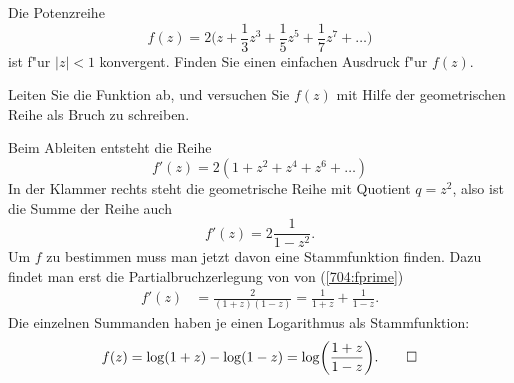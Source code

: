 Die Potenzreihe
\[
f(z)
=
2\biggl(z+\frac{1}{3}z^3+\frac{1}{5}z^5+\frac{1}{7}z^7+\dots\biggr)
\]
ist f"ur $|z|<1$ konvergent.
Finden Sie einen einfachen Ausdruck f"ur $f(z)$.

\begin{hinweis}
Leiten Sie die Funktion ab, und versuchen Sie $f(z)$ mit Hilfe der
geometrischen Reihe als Bruch zu schreiben.
\end{hinweis}

\begin{loesung}
Beim Ableiten entsteht die Reihe
\[
f'(z) = 2(1+z^2+z^4+z^6+\dots)
\]
In der Klammer rechts steht die geometrische Reihe mit Quotient $q=z^2$,
also ist die Summe der Reihe auch
\begin{equation}
f'(z)=2\frac{1}{1-z^2}.
\label{704:fprime}
\end{equation}
Um $f$ zu bestimmen muss man jetzt davon eine Stammfunktion finden.
Dazu findet man erst die Partialbruchzerlegung von von (\ref{704:fprime})
\begin{align*}
f'(z)
&=
\frac{2}{(1+z)(1-z)}
=
\frac1{1+z}+\frac1{1-z}.
\end{align*}
Die einzelnen Summanden haben je einen Logarithmus als Stammfunktion:
\[
f(z) = \log(1+z)-\log(1-z)=\log\biggl(\frac{1+z}{1-z}\biggr).
\qedhere
\]
\end{loesung}


